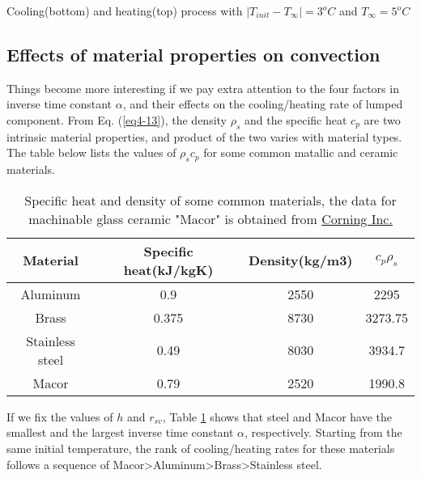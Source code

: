 \begin{marginfigure}
\caption{Cooling(bottom) and heating(top) process with $|T_{init}-T_{\infty}|=3^oC$ and $T_{\infty}=5^oC$}
\label{fig4-3}
\end{marginfigure}
\subsection{Effects of material properties on convection}
Things become more interesting if we pay extra attention to the four factors in inverse time constant $\alpha$, and their effects on the cooling/heating rate of lumped component. From Eq. (\ref{eq4-13}), the density $\rho_s$ and the specific heat $c_p$ are two intrinsic material properties, and product of the two varies with material types. The table below lists the values of $\rho_sc_p$ for some common matallic and ceramic materials.
\begin{table}[h]
\small
\begin{tabular}{c|ccc}
\hline
Material & Specific heat(kJ/kgK) & Density(kg/m3) & $c_p\rho_s$ \\ \hline
Aluminum & 0.9                   & 2550           & 2295        \\
Brass    & 0.375                 & 8730           & 3273.75     \\
Stainless steel    & 0.49                  & 8030           & 3934.7      \\
Macor    & 0.79                  & 2520           & 1990.8      \\ \hline
\end{tabular}
\caption{Specific heat and density of some common materials, the data for machinable glass ceramic "Macor" is obtained from \href{https://www.corning.com/worldwide/en/products/advanced-optics/product-materials/specialty-glass-and-glass-ceramics/glass-ceramics/macor.html}{Corning Inc.}}
\label{tab4-2}
\end{table}
If we fix the values of $h$ and $r_{sv}$, Table \ref{tab4-2} shows that steel and Macor have the smallest and the largest inverse time constant $\alpha$, respectively. Starting from the same initial temperature, the rank of cooling/heating rates for these materials follows a sequence of Macor>Aluminum>Brass>Stainless steel.

